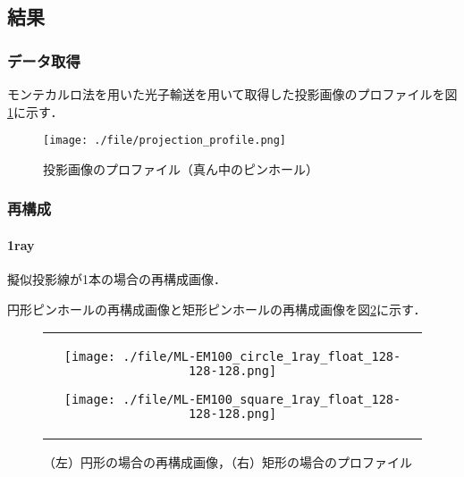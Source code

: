 \documentclass[dvipdfmx,autodetect-engine,twocolumn,10pt]{jsarticle}%
\begin{document}
\newpage
\subsection{結果}
\subsubsection{データ取得}
モンテカルロ法を用いた光子輸送を用いて取得した投影画像のプロファイルを図\ref{proj}に示す．
\begin{figure}[htbp]
  \begin{center}
    \texttt{[image: ./file/projection\_profile.png]}\\
    \caption{投影画像のプロファイル（真ん中のピンホール）}
    \label{proj}
  \end{center}
\end{figure}

\subsubsection{再構成}
\paragraph{1ray}

擬似投影線が1本の場合の再構成画像．

円形ピンホールの再構成画像と矩形ピンホールの再構成画像を図\ref{reconst1}に示す．
\begin{figure}[htbp]
  \begin{center}
    \begin{tabular}{c}
      \begin{minipage}{0.5\hsize}
        \begin{center}
          \texttt{[image: ./file/ML-EM100\_circle\_1ray\_float\_128-128-128.png]}
        \end{center}
      \end{minipage}
      \begin{minipage}{0.5\hsize}
        \begin{center}
          \texttt{[image: ./file/ML-EM100\_square\_1ray\_float\_128-128-128.png]}
        \end{center}
      \end{minipage}
    \end{tabular}
  \caption{（左）円形の場合の再構成画像，（右）矩形の場合のプロファイル}
  \label{reconst1}
  \end{center}
\end{figure}
\end{document}
